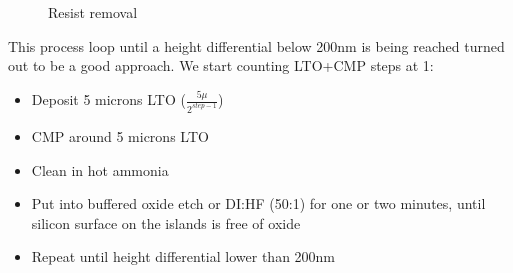 \begin{figure}[H]
	\centering
	\begin{tikzpicture}[node distance = 3cm, auto, thick,scale=\CrossSectionOnly, every node/.style={transform shape}]
		
	\end{tikzpicture}
	\drawStepArrow{}
	\begin{tikzpicture}[node distance = 3cm, auto, thick,scale=\CrossSectionOnly, every node/.style={transform shape}]
		
	\end{tikzpicture}
	\caption{Resist removal}
\end{figure}

This process loop until a height differential below 200nm is being reached turned out to be a good approach. We start counting LTO+CMP steps at 1:
\begin{itemize}
\item Deposit 5 microns LTO ($\frac{5\mu}{2^{step-1}}$)
\item CMP around 5 microns LTO
\item Clean in hot ammonia
\item Put into buffered oxide etch or DI:HF (50:1) for one or two minutes, until silicon surface on the islands is free of oxide
\item Repeat until height differential lower than 200nm
\end{itemize}

\newpage
